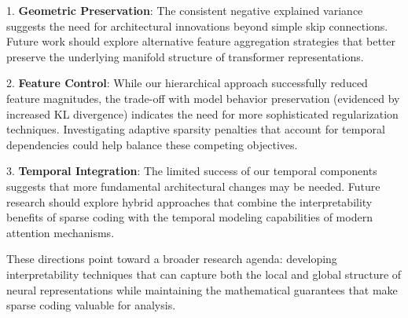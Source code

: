 \documentclass{article} %
\begin{document}
1. \textbf{Geometric Preservation}: The consistent negative explained variance suggests the need for architectural innovations beyond simple skip connections. Future work should explore alternative feature aggregation strategies that better preserve the underlying manifold structure of transformer representations.

2. \textbf{Feature Control}: While our hierarchical approach successfully reduced feature magnitudes, the trade-off with model behavior preservation (evidenced by increased KL divergence) indicates the need for more sophisticated regularization techniques. Investigating adaptive sparsity penalties that account for temporal dependencies could help balance these competing objectives.

3. \textbf{Temporal Integration}: The limited success of our temporal components suggests that more fundamental architectural changes may be needed. Future research should explore hybrid approaches that combine the interpretability benefits of sparse coding with the temporal modeling capabilities of modern attention mechanisms.

These directions point toward a broader research agenda: developing interpretability techniques that can capture both the local and global structure of neural representations while maintaining the mathematical guarantees that make sparse coding valuable for analysis.



\end{document}

